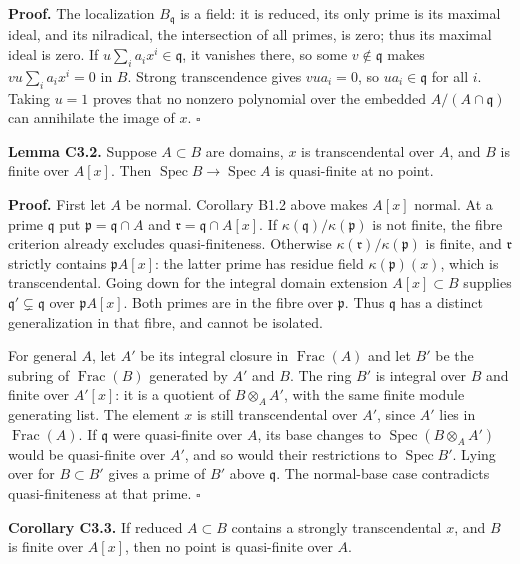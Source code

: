 \documentclass[11pt,a4paper,openany]{report}
\begin{document}
\textbf{Proof.} The localization \(B_{\mathfrak q}\) is a field: it is reduced, its only prime is its maximal ideal, and its nilradical, the intersection of all primes, is zero; thus its maximal ideal is zero. If \(u\sum_i a_ix^i\in\mathfrak q\), it vanishes there, so some \(v\notin\mathfrak q\) makes \(vu\sum_i a_ix^i=0\) in \(B\). Strong transcendence gives \(vua_i=0\), so \(ua_i\in\mathfrak q\) for all \(i\). Taking \(u=1\) proves that no nonzero polynomial over the embedded \(A/(A\cap\mathfrak q)\) can annihilate the image of \(x\). \(\square\)

\textbf{Lemma C3.2.} Suppose \(A\subset B\) are domains, \(x\) is transcendental over \(A\), and \(B\) is finite over \(A[x]\). Then \(\operatorname{Spec}B\to\operatorname{Spec}A\) is quasi-finite at no point.

\textbf{Proof.} First let \(A\) be normal. Corollary B1.2 above makes \(A[x]\) normal. At a prime \(\mathfrak q\) put \(\mathfrak p=\mathfrak q\cap A\) and \(\mathfrak r=\mathfrak q\cap A[x]\). If \(\kappa(\mathfrak q)/\kappa(\mathfrak p)\) is not finite, the fibre criterion already excludes quasi-finiteness. Otherwise \(\kappa(\mathfrak r)/\kappa(\mathfrak p)\) is finite, and \(\mathfrak r\) strictly contains \(\mathfrak pA[x]\): the latter prime has residue field \(\kappa(\mathfrak p)(x)\), which is transcendental. Going down for the integral domain extension \(A[x]\subset B\) supplies \(\mathfrak q'\subsetneq\mathfrak q\) over \(\mathfrak pA[x]\). Both primes are in the fibre over \(\mathfrak p\). Thus \(\mathfrak q\) has a distinct generalization in that fibre, and cannot be isolated.

For general \(A\), let \(A'\) be its integral closure in \(\operatorname{Frac}(A)\) and let \(B'\) be the subring of \(\operatorname{Frac}(B)\) generated by \(A'\) and \(B\). The ring \(B'\) is integral over \(B\) and finite over \(A'[x]\): it is a quotient of \(B\otimes_A A'\), with the same finite module generating list. The element \(x\) is still transcendental over \(A'\), since \(A'\) lies in \(\operatorname{Frac}(A)\). If \(\mathfrak q\) were quasi-finite over \(A\), its base changes to \(\operatorname{Spec}(B\otimes_A A')\) would be quasi-finite over \(A'\), and so would their restrictions to \(\operatorname{Spec}B'\). Lying over for \(B\subset B'\) gives a prime of \(B'\) above \(\mathfrak q\). The normal-base case contradicts quasi-finiteness at that prime. \(\square\)

\textbf{Corollary C3.3.} If reduced \(A\subset B\) contains a strongly transcendental \(x\), and \(B\) is finite over \(A[x]\), then no point is quasi-finite over \(A\).
\end{document}
